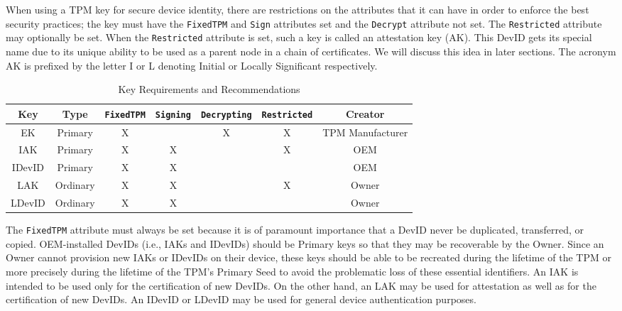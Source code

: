 When using a TPM key for secure device identity, there are restrictions on the attributes that it can have in order to enforce the best security practices; the key must have the \verb|FixedTPM| and \verb|Sign| attributes set and the \verb|Decrypt| attribute not set. The \verb|Restricted| attribute may optionally be set. When the \verb|Restricted| attribute is set, such a key is called an attestation key (AK). This DevID gets its special name due to its unique ability to be used as a parent node in a chain of certificates. We will discuss this idea in later sections. The acronym AK is prefixed by the letter I or L denoting Initial or Locally Significant respectively. 
\begin{table}[h]
  \begin{center}
    \scriptsize 
    \sffamily
    \renewcommand{\arraystretch}{1.5}
    \begin{tabular}{ |c|c|c|c|c|c|c| }
      \hline
      Key & Type & \verb|FixedTPM| & \verb|Signing| & \verb|Decrypting| & \verb|Restricted| & Creator \\
      \hline
      \hline
      EK & Primary       & X &   & X & X & TPM Manufacturer \\
      \hline
      IAK & Primary      & X & X &   & X & OEM \\
      \hline
      IDevID & Primary   & X & X &   &   & OEM \\
      \hline
      LAK & Ordinary     & X & X &   & X & Owner \\
      \hline
      LDevID & Ordinary  & X & X &   &   & Owner \\
      \hline
    \end{tabular}
    \caption{Key Requirements and Recommendations}
    \label{fig:req_and_recs}
  \end{center}
\end{table}
The \verb|FixedTPM| attribute must always be set because it is of paramount importance that a DevID never be duplicated, transferred, or copied. OEM-installed DevIDs (i.e., IAKs and IDevIDs) should be Primary keys so that they may be recoverable by the Owner. Since an Owner cannot provision new IAKs or IDevIDs on their device, these keys should be able to be recreated during the lifetime of the TPM or more precisely during the lifetime of the TPM’s Primary Seed to avoid the problematic loss of these essential identifiers. An IAK is intended to be used only for the certification of new DevIDs. On the other hand, an LAK may be used for attestation as well as for the certification of new DevIDs. An IDevID or LDevID may be used for general device authentication purposes. 


